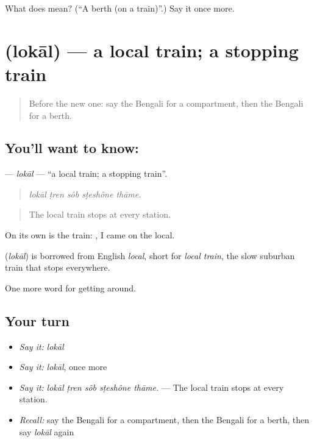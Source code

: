\begin{tcolorbox}[breakable,colback=teal!4,colframe=teal!35!black,title={Before you move on}]
What does  mean? (\textquotedblleft{}A berth (on a train)\textquotedblright{}.) Say it once more.
\end{tcolorbox}
\section[\texorpdfstring{\bn{লোকাল} (lokāl)}{লোকাল (lokāl)}]{ (lokāl) — a local train; a stopping train}

\label{lesson:BN-C384-lokal}



\begin{quote}
Before the new one: say the Bengali for a compartment, then the Bengali for a berth.
\end{quote}

\subsection*{You'll want to know: }
\textbf{} — \emph{lokāl} — \textquotedblleft{}a local train; a stopping train\textquotedblright{}.

\begin{quote}
    
\end{quote}

\begin{quote}
\emph{lokāl ṭren sôb sṭeshône thāme.}
\end{quote}

\begin{quote}
The local train stops at every station.
\end{quote}

On its own  is the train:  , I came on the local.

\begin{cousinweb}
\textbf{} (\emph{lokāl}) is borrowed from English \emph{local}, short for \emph{local train}, the slow suburban train that stops everywhere.
\end{cousinweb}

\begin{grammarlens}[title={What you've built}]
One more word for getting around.
\end{grammarlens}

\subsection*{Your turn}
\begin{itemize}
\raggedright
  \item \emph{Say it:} \emph{lokāl}
  \item \emph{Say it:} \emph{lokāl}, once more
  \item \emph{Say it:} \emph{lokāl ṭren sôb sṭeshône thāme.} — The local train stops at every station.
  \item \emph{Recall:} say the Bengali for a compartment, then the Bengali for a berth, then say \emph{lokāl} again
\end{itemize}

